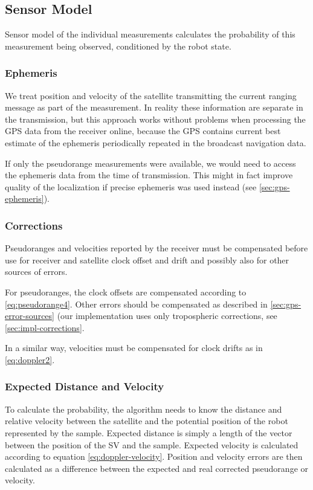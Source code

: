 \subsection{Sensor Model}
Sensor model of the individual measurements calculates the probability of this
measurement being observed, conditioned by the robot state.

\subsubsection{Ephemeris}
We treat position and velocity of the satellite transmitting
the current ranging message as part of the measurement.
In reality these information are separate in the transmission, but
this approach works without problems when processing the GPS data from the receiver online,
because the GPS contains current best estimate of the ephemeris periodically repeated
in the broadcast navigation data.

If only the pseudorange measurements were available, we would need to access the
ephemeris data from the time of transmission.
This might in fact improve quality of the localization if precise ephemeris
was used instead (see \cref{sec:gps-ephemeris}).

\subsubsection{Corrections}
Pseudoranges and velocities reported by the receiver must be compensated before
use for receiver and satellite clock offset and drift and possibly also for other
sources of errors.

For pseudoranges, the clock offsets are compensated according to \cref{eq:pseudorange4}.
Other errors should be compensated as described in \cref{sec:gps-error-sources}
(our implementation uses only tropospheric corrections, see \cref{sec:impl-corrections}.

In a similar way, velocities must be compensated for clock drifts 
as in \eqref{eq:doppler2}.

\subsubsection{Expected Distance and Velocity}
To calculate the probability, the algorithm needs to know the distance and relative
velocity between the satellite and the potential position of the robot represented
by the sample.
Expected distance is simply a length of the vector between the position of the SV
and the sample.
Expected velocity is calculated according to equation \eqref{eq:doppler-velocity}.
Position and velocity errors are then calculated as a difference between the expected
and real corrected pseudorange or velocity.

